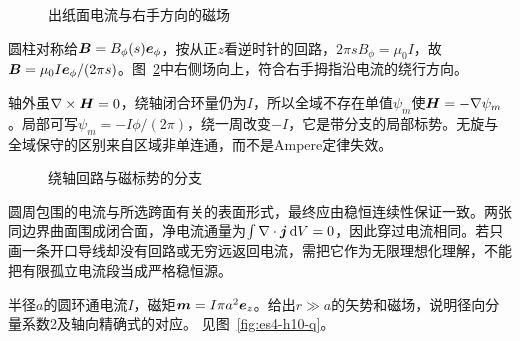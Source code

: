 \begin{figure}[H]\centering
{}
\caption{出纸面电流与右手方向的磁场}\label{fig:es4-h9-q}
\end{figure}
\begin{solution}
圆柱对称给$\bm{B}=B_\phi(s)\bm{e}_\phi$，按从正$z$看逆时针的回路，$2\pi sB_\phi=\mu_0I$，故$\bm{B}=\mu_0I\bm{e}_\phi/(2\pi s)$。图~\ref{fig:es4-h9-s}中右侧场向上，符合右手拇指沿电流的绕行方向。

轴外虽$\nabla\times\bm{H}=0$，绕轴闭合环量仍为$I$，所以全域不存在单值$\psi_m$使$\bm{H}=-\nabla\psi_m$。局部可写$\psi_m=-I\phi/(2\pi)$，绕一周改变$-I$，它是带分支的局部标势。无旋与全域保守的区别来自区域非单连通，而不是Ampere定律失效。
\begin{figure}[H]\centering
{}
\caption{绕轴回路与磁标势的分支}\label{fig:es4-h9-s}
\end{figure}


圆周包围的电流与所选跨面有关的表面形式，最终应由稳恒连续性保证一致。两张同边界曲面围成闭合面，净电流通量为$\int\nabla\cdot\bm{j}\mathop{}\!\mathrm d V=0$，因此穿过电流相同。若只画一条开口导线却没有回路或无穷远返回电流，需把它作为无限理想化理解，不能把有限孤立电流段当成严格稳恒源。
\end{solution}

\begin{exercise}[小电流环的远处磁场]\label{ex:es4-h10}
半径$a$的圆环通电流$I$，磁矩$\bm{m}=I\pi a^2\bm{e}_z$。给出$r\gg a$的矢势和磁场，说明径向分量系数2及轴向精确式的对应。 见图~\ref{fig:es4-h10-q}。
\end{exercise}

